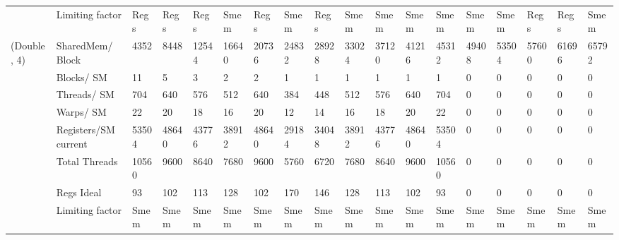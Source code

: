 \begin{tabular}{llllllllllllllllll}
            & Limiting factor &   Regs &   Regs &   Regs &   Smem &   Regs &   Smem &   Regs &   Smem &   Smem &   Smem &   Smem &   Smem &   Smem &   Regs &   Regs &   Smem \\
(Double, 4) & SharedMem/ Block &   4352 &   8448 &  12544 &  16640 &  20736 &  24832 &  28928 &  33024 &  37120 &  41216 &  45312 &  49408 &  53504 &  57600 &  61696 &  65792 \\
            & Blocks/ SM &     11 &      5 &      3 &      2 &      2 &      1 &      1 &      1 &      1 &      1 &      1 &      0 &      0 &      0 &      0 &      0 \\
            & Threads/ SM &    704 &    640 &    576 &    512 &    640 &    384 &    448 &    512 &    576 &    640 &    704 &      0 &      0 &      0 &      0 &      0 \\
            & Warps/ SM &     22 &     20 &     18 &     16 &     20 &     12 &     14 &     16 &     18 &     20 &     22 &      0 &      0 &      0 &      0 &      0 \\
            & Registers/SM current &  53504 &  48640 &  43776 &  38912 &  48640 &  29184 &  34048 &  38912 &  43776 &  48640 &  53504 &      0 &      0 &      0 &      0 &      0 \\
            & Total Threads &  10560 &   9600 &   8640 &   7680 &   9600 &   5760 &   6720 &   7680 &   8640 &   9600 &  10560 &      0 &      0 &      0 &      0 &      0 \\
            & Regs Ideal &     93 &    102 &    113 &    128 &    102 &    170 &    146 &    128 &    113 &    102 &     93 &      0 &      0 &      0 &      0 &      0 \\
            & Limiting factor &   Smem &   Smem &   Smem &   Smem &   Smem &   Smem &   Smem &   Smem &   Smem &   Smem &   Smem &   Smem &   Smem &   Smem &   Smem &   Smem \\
\bottomrule
\end{tabular}

